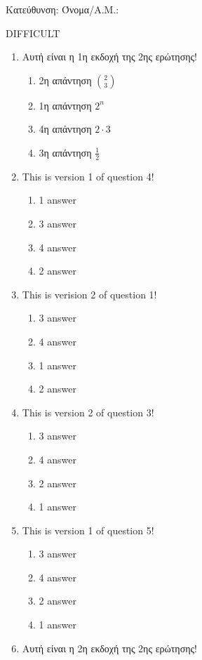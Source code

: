 \documentclass[a4paper, 11pt]{article}
\begin{document}
{\flushleft Κατεύθυνση: }
{\flushleft Όνομα/Α.Μ.: }
\vspace*{0.5cm}
\begin{center} {\Large  DIFFICULT } \end{center}
\begin{enumerate}
\item Αυτή είναι η 1η εκδοχή της 2ης ερώτησης!
\begin{enumerate}[(1)]
    \item 2η απάντηση $\binom{2}{3}$
    \item 1η απάντηση $2^n$
    \item 4η απάντηση $2\cdot 3$
    \item 3η απάντηση $\frac{1}{2}$
\end{enumerate}
\item This is version 1 of question 4!
\begin{enumerate}[(1)]
    \item 1 answer
    \item 3 answer
    \item 4 answer
    \item 2 answer
\end{enumerate}
\item This is verision 2 of question 1!
\begin{enumerate}[(1)]
    \item 3 answer
    \item 4 answer
    \item 1 answer
    \item 2 answer
\end{enumerate}
\item This is version 2 of question 3!
\begin{enumerate}[(1)]
    \item 3 answer
    \item 4 answer
    \item 2 answer
    \item 1 answer
\end{enumerate}
\item This is version 1 of question 5!
\begin{enumerate}[(1)]
    \item 3 answer
    \item 4 answer
    \item 2 answer
    \item 1 answer
\end{enumerate}
\item Αυτή είναι η 2η εκδοχή της 2ης ερώτησης!

\end{enumerate}
\end{document}
